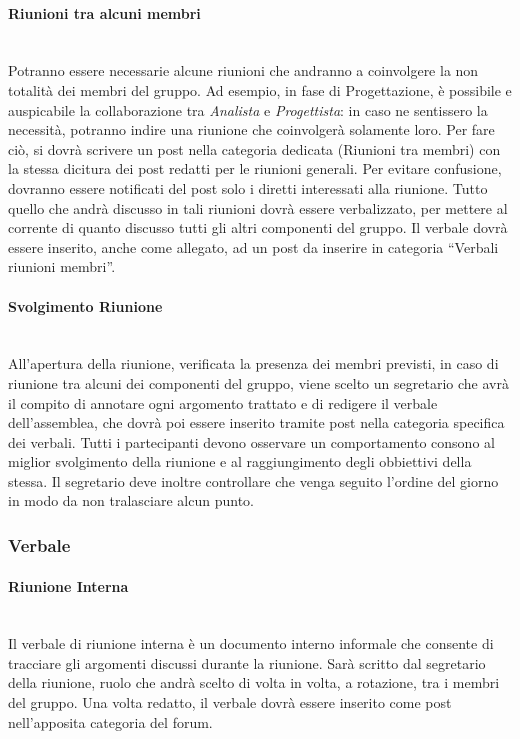 \paragraph{Riunioni tra alcuni membri}\mbox{}\\
Potranno essere necessarie alcune riunioni che andranno a coinvolgere la non totalità dei membri del gruppo. Ad esempio, in fase di Progettazione, è possibile e auspicabile la collaborazione tra \textit{Analista} e \textit{Progettista}: in caso ne sentissero la necessità, potranno indire una riunione che coinvolgerà solamente loro. Per fare ciò, si dovrà scrivere un post nella categoria dedicata (Riunioni tra membri) con la stessa dicitura dei post redatti per le riunioni generali. Per evitare confusione, dovranno essere notificati del post solo i diretti interessati alla riunione. Tutto quello che andrà discusso in tali riunioni dovrà essere verbalizzato, per mettere al corrente di quanto discusso tutti gli altri componenti del gruppo. Il verbale dovrà essere inserito, anche come allegato, ad un post da inserire in categoria “Verbali riunioni membri”.

\paragraph{Svolgimento Riunione}\mbox{}\\
All'apertura della riunione, verificata la presenza dei membri previsti, in caso di riunione tra alcuni dei componenti del gruppo, viene scelto un
segretario che avrà il compito di annotare ogni argomento trattato e di redigere il verbale
dell'assemblea, che dovrà poi essere inserito tramite post nella categoria specifica dei verbali. Tutti i partecipanti devono osservare un comportamento consono al miglior svolgimento
della riunione e al raggiungimento degli obbiettivi della stessa. Il segretario deve inoltre
controllare che venga seguito l'ordine del giorno in modo da non tralasciare alcun punto.

\subsubsection{Verbale}
\paragraph{Riunione Interna}\mbox{}\\
Il verbale di riunione interna è un documento interno informale che consente di tracciare gli argomenti discussi durante la riunione. Sarà scritto dal segretario della riunione, ruolo che andrà scelto di volta in volta, a rotazione, tra i membri del gruppo. Una volta redatto, il verbale dovrà essere inserito come post nell'apposita categoria del forum.

